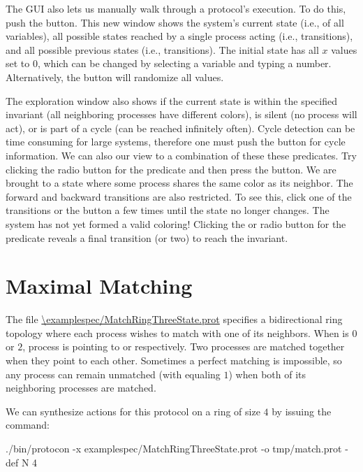 The GUI also lets us manually walk through a protocol's execution.
To do this, push the  button.
This new window shows the system's current state (i.e.,  of all variables), all possible states reached by a single process acting (i.e.,  transitions), and all possible previous states (i.e.,  transitions).
The initial state has all $x$ values set to $0$, which can be changed by selecting a variable and typing a number.
Alternatively, the  button will randomize all values.

The exploration window also shows if the current state is within the specified invariant (all neighboring processes have different colors), is silent (no process will act), or is part of a cycle (can be reached infinitely often).
Cycle detection can be time consuming for large systems, therefore one must push the  button for cycle information.
We can also  our view to a combination of these these predicates.
Try clicking the  radio button for the  predicate and then press the  button.
We are brought to a state where some process shares the same color as its neighbor.
The forward and backward transitions are also restricted.
To see this, click one of the  transitions or the  button a few times until the state no longer changes.
The system has not yet formed a valid coloring!
Clicking the  or  radio button for the  predicate reveals a final transition (or two) to reach the invariant.


\section{Maximal Matching}

The file \url{\examplespec/MatchRingThreeState.prot} specifies a bidirectional ring topology where each process wishes to match with one of its neighbors.
When  is $0$ or $2$, process  is pointing to  or  respectively.
Two processes are matched together when they point to each other.
Sometimes a perfect matching is impossible, so any process  can remain unmatched (with  equaling $1$) when both of its neighboring processes are matched.

We can synthesize actions for this protocol on a ring of size $4$ by issuing the command:
\begin{code}
./bin/protocon -x examplespec/MatchRingThreeState.prot -o tmp/match.prot -def N 4
\end{code}

